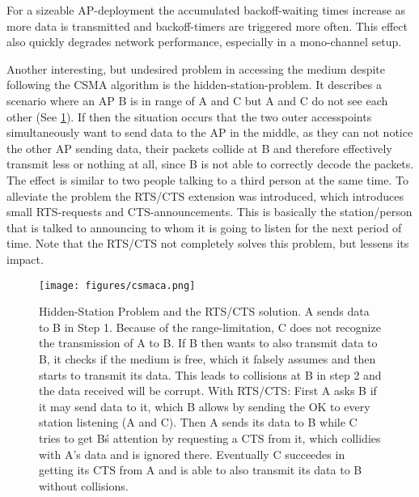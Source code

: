 	For a sizeable AP-deployment the accumulated backoff-waiting times increase as more data is transmitted and backoff-timers are triggered more often.
	This effect also quickly degrades network performance, especially in a mono-channel setup.
	
	Another interesting, but undesired problem in accessing the medium despite following the CSMA algorithm is the hidden-station-problem.
	It describes a scenario where an \ac{AP} B is in range of A and C but A and C do not see each other (See \ref{fig:csmaca}).
	If then the situation occurs that the two outer accesspoints simultaneously want to send data to the \ac{AP} in the middle, as they can not notice the 
	other AP sending data, their packets collide at B and therefore effectively transmit less or nothing at all, since B is not able to correctly decode the packets.
	The effect is similar to two people talking to a third person at the same time.
	To alleviate the problem the RTS/CTS extension was introduced, which introduces small \ac{RTS}-requests and \ac{CTS}-announcements. 
	This is basically the station/person that is talked to announcing to whom it is going to listen for the next period of time.
	Note that the RTS/CTS not completely solves this problem, but lessens its impact.
	
	\begin{figure}[th!]
	  \centering
	  \texttt{[image: figures/csmaca.png]}
	  \caption{Hidden-Station Problem and the RTS/CTS solution. A sends data to B in Step 1.
	    Because of the range-limitation, C does not recognize the transmission of A to B. 
	    If B then wants to also transmit data to B, it checks if the medium is free, which it falsely assumes
	    and then starts to transmit its data. This leads to collisions at B in step 2 and the data received will be corrupt.
	    With RTS/CTS: First A asks B if it may send data to it, which B allows by sending the OK to every station listening (A and C). 
	    Then A sends its data to B while C tries to get B\'s attention by requesting a CTS from it, which collidies with A's data and is ignored there.
	    Eventually C succeedes in getting its CTS from A and is able to also transmit its data to B without collisions.}
	  \label{fig:csmaca}
	\end{figure}

